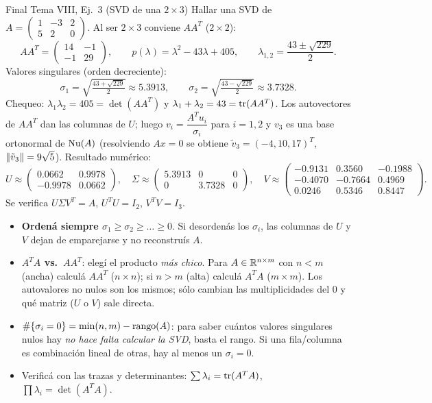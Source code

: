 \begin{ejemplo}{Final Tema VIII, Ej.\ 3 (SVD de una $2\times3$)}
Hallar una SVD de $A=\begin{pmatrix} 1 & -3 & 2 \\ 5 & 2 & 0 \end{pmatrix}$. Al ser $2\times3$ conviene $AA^T$ ($2\times2$):
\[
AA^T=\begin{pmatrix} 14 & -1 \\ -1 & 29 \end{pmatrix},
\qquad
p(\lambda)=\lambda^2-43\lambda+405,
\qquad
\lambda_{1,2}=\frac{43\pm\sqrt{229}}{2}.
\]
Valores singulares (orden decreciente):
\[
\sigma_1=\sqrt{\tfrac{43+\sqrt{229}}{2}}\approx 5.3913,
\qquad
\sigma_2=\sqrt{\tfrac{43-\sqrt{229}}{2}}\approx 3.7328 .
\]
Chequeo: $\lambda_1\lambda_2=405=\det(AA^T)$ y $\lambda_1+\lambda_2=43=\operatorname{tr}(AA^T)$. Los autovectores de $AA^T$ dan las columnas de $U$; luego $v_i=\dfrac{A^Tu_i}{\sigma_i}$ para $i=1,2$ y $v_3$ es una base ortonormal de $\operatorname{Nu}(A)$ (resolviendo $Ax=0$ se obtiene $\tilde v_3=(-4,10,17)^T$, $\left\lVert \tilde v_3 \right\rVert=9\sqrt5$). Resultado numérico:
\[
U\approx\begin{pmatrix} 0.0662 & 0.9978 \\ -0.9978 & 0.0662 \end{pmatrix},
\quad
\Sigma\approx\begin{pmatrix} 5.3913 & 0 & 0 \\ 0 & 3.7328 & 0 \end{pmatrix},
\quad
V\approx\begin{pmatrix} -0.9131 & 0.3560 & -0.1988 \\ -0.4070 & -0.7664 & 0.4969 \\ 0.0246 & 0.5346 & 0.8447 \end{pmatrix}.
\]
Se verifica $U\Sigma V^T=A$, $U^TU=I_2$, $V^TV=I_3$.
\end{ejemplo}

\begin{truco}
\begin{itemize}
\item \textbf{Ordená siempre $\sigma_1\ge\sigma_2\ge\dots\ge0$}. Si desordenás los $\sigma_i$, las columnas de $U$ y $V$ dejan de emparejarse y no reconstruís $A$.
\item \textbf{$A^TA$ vs.\ $AA^T$}: elegí el producto \emph{más chico}. Para $A\in\mathbb{R}^{n\times m}$ con $n<m$ (ancha) calculá $AA^T$ ($n\times n$); si $n>m$ (alta) calculá $A^TA$ ($m\times m$). Los autovalores no nulos son los mismos; sólo cambian las multiplicidades del $0$ y qué matriz ($U$ o $V$) sale directa.
\item \textbf{$\#\{\sigma_i=0\}=\min(n,m)-\operatorname{rango}(A)$}: para saber cuántos valores singulares nulos hay \emph{no hace falta calcular la SVD}, basta el rango. Si una fila/columna es combinación lineal de otras, hay al menos un $\sigma_i=0$.
\item Verificá con las trazas y determinantes: $\sum\lambda_i=\operatorname{tr}(A^TA)$, $\prod\lambda_i=\det(A^TA)$.
\end{itemize}
\end{truco}



